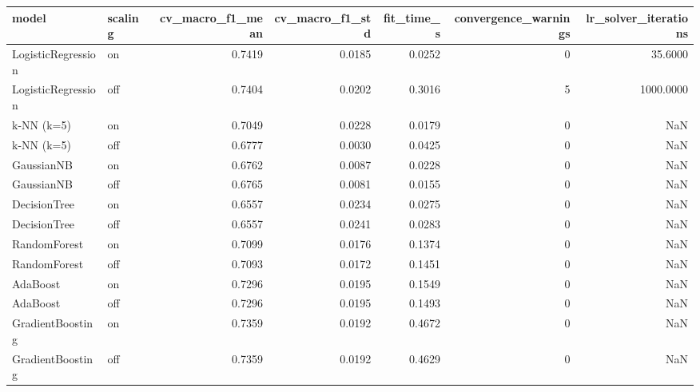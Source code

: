 \begin{tabular}{llrrrrr}
\toprule
model & scaling & cv\_macro\_f1\_mean & cv\_macro\_f1\_std & fit\_time\_s & convergence\_warnings & lr\_solver\_iterations \\
\midrule
LogisticRegression & on & 0.7419 & 0.0185 & 0.0252 & 0 & 35.6000 \\
LogisticRegression & off & 0.7404 & 0.0202 & 0.3016 & 5 & 1000.0000 \\
k-NN (k=5) & on & 0.7049 & 0.0228 & 0.0179 & 0 & NaN \\
k-NN (k=5) & off & 0.6777 & 0.0030 & 0.0425 & 0 & NaN \\
GaussianNB & on & 0.6762 & 0.0087 & 0.0228 & 0 & NaN \\
GaussianNB & off & 0.6765 & 0.0081 & 0.0155 & 0 & NaN \\
DecisionTree & on & 0.6557 & 0.0234 & 0.0275 & 0 & NaN \\
DecisionTree & off & 0.6557 & 0.0241 & 0.0283 & 0 & NaN \\
RandomForest & on & 0.7099 & 0.0176 & 0.1374 & 0 & NaN \\
RandomForest & off & 0.7093 & 0.0172 & 0.1451 & 0 & NaN \\
AdaBoost & on & 0.7296 & 0.0195 & 0.1549 & 0 & NaN \\
AdaBoost & off & 0.7296 & 0.0195 & 0.1493 & 0 & NaN \\
GradientBoosting & on & 0.7359 & 0.0192 & 0.4672 & 0 & NaN \\
GradientBoosting & off & 0.7359 & 0.0192 & 0.4629 & 0 & NaN \\
\bottomrule
\end{tabular}
